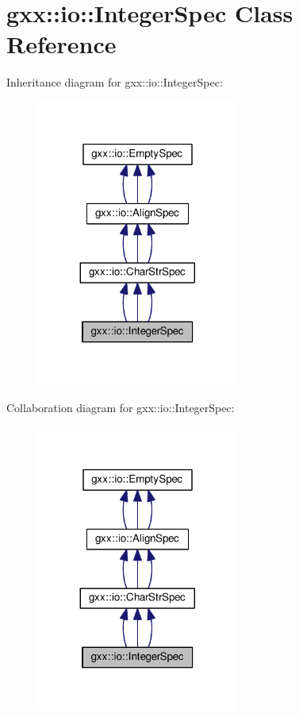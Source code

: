 \hypertarget{classgxx_1_1io_1_1IntegerSpec}{}\section{gxx\+:\+:io\+:\+:Integer\+Spec Class Reference}
\label{classgxx_1_1io_1_1IntegerSpec}


Inheritance diagram for gxx\+:\+:io\+:\+:Integer\+Spec\+:
\nopagebreak
\begin{figure}[H]
\begin{center}
\leavevmode
\includegraphics[width=188pt]{classgxx_1_1io_1_1IntegerSpec__inherit__graph}
\end{center}
\end{figure}


Collaboration diagram for gxx\+:\+:io\+:\+:Integer\+Spec\+:
\nopagebreak
\begin{figure}[H]
\begin{center}
\leavevmode
\includegraphics[width=188pt]{classgxx_1_1io_1_1IntegerSpec__coll__graph}
\end{center}
\end{figure}
